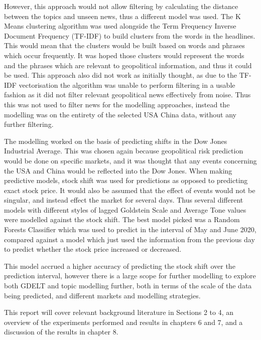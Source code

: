 However, this approach would not allow filtering by calculating the distance between the topics and unseen news, thus a different model was used. The K Means clustering algorithm was used alongside the Term Frequency Inverse Document Frequency (TF-IDF) to build clusters from the words in the headlines. This would mean that the clusters would be built based on words and phrases which occur frequently. It was hoped those clusters would represent the words and the phrases which are relevant to geopolitical information, and thus it could be used. This approach also did not work as initially thought, as due to the TF-IDF vectorisation the algorithm was unable to perform filtering in a usable fashion as it did not filter relevant geopolitical news effectively from noise. Thus this was not used to filter news for the modelling approaches, instead the modelling was on the entirety of the selected USA China data, without any further filtering. 

The modelling worked on the basis of predicting shifts in the Dow Jones Industrial Average. This was chosen again because geopolitical risk prediction would be done on specific markets, and it was thought that any events concerning the USA and China would be reflected into the Dow Jones. When making predictive models, stock shift was used for predictions as opposed to predicting exact stock price. It would also be assumed that the effect of events would not be singular, and instead effect the market for several days. Thus several different models with different styles of lagged Goldstein Scale and Average Tone values were modelled against the stock shift. The best model picked was a Random Forests Classifier which was used to predict in the interval of May and June 2020, compared against a model which just used the information from the previous day to predict whether the stock price increased or decreased. 

This model accrued a higher accuracy of predicting the stock shift over the prediction interval, however there is a large scope for further modelling to explore both GDELT and topic modelling further, both in terms of the scale of the data being predicted, and different markets and modelling strategies. 

This report will cover relevant background literature in Sections 2 to 4, an overview of the experiments performed and results in chapters 6 and 7, and a discussion of the results in chapter 8.